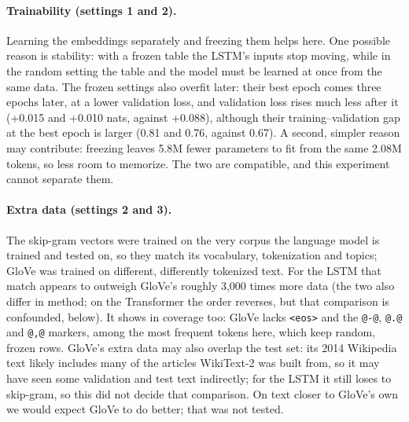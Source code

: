 \documentclass[10pt]{article}
\newcommand{\tok}[1]{\texttt{#1}}
\begin{document}
\paragraph{Trainability (settings 1 and 2).} Learning the embeddings separately and freezing them helps here. One possible reason is stability: with a frozen table the LSTM's inputs stop moving, while in the random setting the table and the model must be learned at once from the same data. The frozen settings also overfit later: their best epoch comes three epochs later, at a lower validation loss, and validation loss rises much less after it (+0.015 and +0.010 nats, against +0.088), although their training--validation gap at the best epoch is larger (0.81 and 0.76, against 0.67). A second, simpler reason may contribute: freezing leaves 5.8M fewer parameters to fit from the same 2.08M tokens, so less room to memorize. The two are compatible, and this experiment cannot separate them.

\paragraph{Extra data (settings 2 and 3).} The skip-gram vectors were trained on the very corpus the language model is trained and tested on, so they match its vocabulary, tokenization and topics; GloVe was trained on different, differently tokenized text. For the LSTM that match appears to outweigh GloVe's roughly 3,000 times more data (the two also differ in method; on the Transformer the order reverses, but that comparison is confounded, below). It shows in coverage too: GloVe lacks \tok{<eos>} and the \tok{@-@}, \tok{@.@} and \tok{@,@} markers, among the most frequent tokens here, which keep random, frozen rows. GloVe's extra data may also overlap the test set: its 2014 Wikipedia text likely includes many of the articles WikiText-2 was built from, so it may have seen some validation and test text indirectly; for the LSTM it still loses to skip-gram, so this did not decide that comparison. On text closer to GloVe's own we would expect GloVe to do better; that was not tested.
\end{document}

